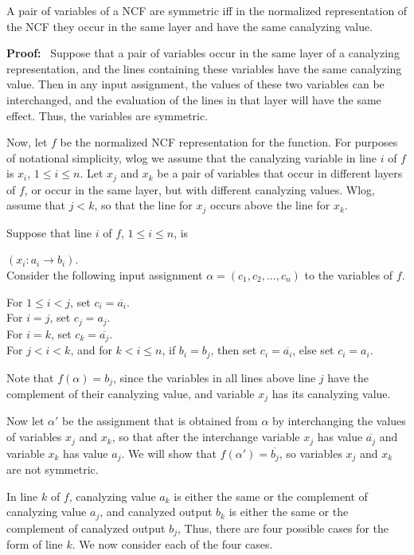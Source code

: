 \begin{theorem}\label{thm:ncf_symmetric_variables}
A pair of variables of a NCF are symmetric iff
in the normalized representation of the NCF
they occur in the same layer and have the same canalyzing value.
\end{theorem}
\noindent
\textbf{Proof:}~
Suppose that a pair of variables occur in the same layer of a canalyzing representation, 
and the lines containing these variables have the same canalyzing value.
Then in any input assignment, the values of these two variables can be interchanged,
and the evaluation of the lines in that layer will have the same effect.
Thus, the variables are symmetric.

Now, let $f$ be the normalized NCF representation for the function.
For purposes of notational simplicity, 
wlog we assume that the canalyzing variable in line $i$ of $f$ is $x_i$, $1 \leq i \leq n$.
Let  $x_j$ and $x_k$ be a pair of variables that occur in different layers of $f$,
or occur in the same layer, but with different canalyzing values.
Wlog, assume that $j < k$, so that the line for $x_j$ occurs above the line for $x_k$.

Suppose that line $i$ of $f$, $1 \leq i \leq n$, is 

\noindent
$(x_i : a_i \rightarrow b_i)$. \\
Consider the following input assignment $\alpha = (c_1, c_2, \ldots,  c_n)$ 
to the variables of $f$.

\noindent
For $1 \leq i < j$, set $c_i = \overline{a_i}$. \\
For $i = j$, set $c_j =a_j$. \\
For $i = k$, set $c_k =\overline{a_j}$. \\
For $j < i < k$, and for  $k < i \leq n$, 
if $b_i = b_j$, then set $c_i =  \overline{a_i}$,
else set $c_i =  a_i$.

Note that $f(\alpha) = b_j$,
since the variables in all lines above line $j$ have the complement of their canalyzing value,
and variable $x_j$ has its canalyzing value.

Now let $\alpha'$ be the assignment that is obtained from $\alpha$ by interchanging the values
of variables $x_j$ and $x_k$,
so that after the interchange variable $x_j$ has value $\overline{a_j}$
and variable $x_k$ has value $a_j$.
We will show that 
$f(\alpha') = \overline{b_j}$,
so variables $x_j$ and $x_k$ are not symmetric.

In line $k$ of $f$, canalyzing value $a_k$ is either the same or the complement of canalyzing value $a_j$,
and canalyzed output $b_k$ is either the same or the complement of canalyzed output $b_j$,
Thus, there are four possible cases for the form of line $k$.
We now consider each of the four cases.

